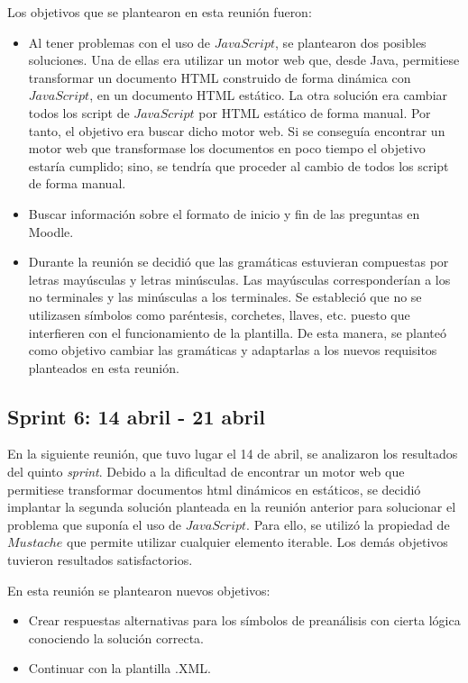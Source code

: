 Los objetivos que se plantearon en esta reunión fueron:
\begin{itemize}
\item Al tener problemas con el uso de $JavaScript$, se plantearon dos posibles soluciones. Una de ellas era utilizar un motor web que, desde Java, permitiese transformar un documento HTML construido de forma dinámica con $JavaScript$, en un documento HTML estático. La otra solución era cambiar todos los script de $JavaScript$ por HTML estático de forma manual. Por tanto, el objetivo era buscar dicho motor web. Si se conseguía encontrar un motor web que transformase los documentos en poco tiempo el objetivo estaría cumplido; sino, se tendría que proceder al cambio de todos los script de forma manual.
\item Buscar información sobre el formato de inicio y fin de las preguntas en Moodle.
\item Durante la reunión se decidió que las gramáticas estuvieran compuestas por letras mayúsculas y letras minúsculas. Las mayúsculas corresponderían a los no terminales y las minúsculas a los terminales. Se estableció que no se utilizasen símbolos como paréntesis, corchetes, llaves, etc. puesto que interfieren con el funcionamiento de la plantilla. De esta manera, se planteó como objetivo cambiar las gramáticas y adaptarlas a los nuevos requisitos planteados en esta reunión.
\end{itemize}



\subsection{Sprint 6: 14 abril - 21 abril}
En la siguiente reunión, que tuvo lugar el 14 de abril, se analizaron los resultados del quinto \textit{sprint}. Debido a la dificultad de encontrar un motor web que permitiese transformar documentos html dinámicos en estáticos, se decidió implantar la segunda solución planteada en la reunión anterior para solucionar el problema que suponía el uso de $JavaScript$. Para ello, se utilizó la propiedad de $Mustache$ que permite utilizar cualquier elemento iterable. Los demás objetivos tuvieron resultados satisfactorios.

En esta reunión se plantearon nuevos objetivos:
\begin{itemize}
\item Crear respuestas alternativas para los símbolos de preanálisis con cierta lógica conociendo la solución correcta.
\item Continuar con la plantilla .XML.
\end{itemize}


